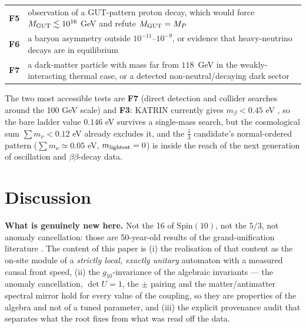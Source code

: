 \documentclass[aps,prd,amsmath,amssymb,superscriptaddress,longbibliography,floatfix,preprint]{revtex4-2}
\begin{document}
{\begin{longtable}{ll}
\arrayrulecolor{black!40}\hline\arrayrulecolor{black}
\textbf{F5} & \parbox[c]{13.91cm}{\vspace{2.5pt}\raggedright {} observation of a GUT-pattern proton decay, which would force \mbox{$M_{\rm GUT} \lesssim 10^{16}$} GeV and refute \mbox{$M_{\rm GUT} = M_P$}\vspace{2.5pt}} \\
\hline{}
\textbf{F6} & \parbox[c]{13.91cm}{\vspace{2.5pt}\raggedright {} a baryon asymmetry outside \mbox{$10^{-11}$}--\mbox{$10^{-9}$}, or evidence that heavy-neutrino decays are in equilibrium\vspace{2.5pt}} \\
\hline{}
\textbf{F7} & \parbox[c]{13.91cm}{\vspace{2.5pt}\raggedright {} a dark-matter particle with mass far from \mbox{$118$ GeV} in the weakly-interacting thermal case, or a detected non-neutral/decaying dark sector\vspace{2.5pt}} \\
\end{longtable}
}

The two most accessible tests are \textbf{F7} (direct detection and collider searches around the 100 GeV scale) and \textbf{F3}: KATRIN currently gives $m_\beta < 0.45$ eV \cite{ref16}, so the bare ladder value $0.146$ eV survives a single-mass search, but the cosmological sum $\sum m_\nu < 0.12$ eV already excludes it, and the $\tfrac13$ candidate's normal-ordered pattern ($\sum m_\nu \simeq 0.05$ eV, $m_{\rm lightest} = 0$) is inside the reach of the next generation of oscillation and $\beta\beta$-decay data.

\section{Discussion}

\textbf{What is genuinely new here.} Not the 16 of $\mathrm{Spin}(10)$, not the $5/3$, not anomaly cancellation: those are 50-year-old results of the grand-unification literature \cite{ref06,ref07,ref08,ref09,ref12}. The content of this paper is (i) the realisation of that content as the on-site module of a \emph{strictly local, exactly unitary} automaton with a measured causal front speed, (ii) the $g_{10}$-invariance of the algebraic invariants --- the anomaly cancellation, $\det U = 1$, the $\pm$ pairing and the matter/antimatter spectral mirror hold for every value of the coupling, so they are properties of the algebra and not of a tuned parameter, and (iii) the explicit provenance audit that separates what the root fixes from what was read off the data.
\end{document}
